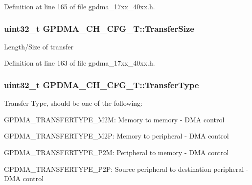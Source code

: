 Definition at line 165 of file gpdma\+\_\+17xx\+\_\+40xx.\+h.

\subsubsection[{\texorpdfstring{Transfer\+Size}{TransferSize}}]{\setlength{\rightskip}{0pt plus 5cm}uint32\+\_\+t G\+P\+D\+M\+A\+\_\+\+C\+H\+\_\+\+C\+F\+G\+\_\+\+T\+::\+Transfer\+Size}\hypertarget{structGPDMA__CH__CFG__T_a5666efb9edb055974b590443ea45ed7b}{}\label{structGPDMA__CH__CFG__T_a5666efb9edb055974b590443ea45ed7b}
Length/\+Size of transfer 

Definition at line 163 of file gpdma\+\_\+17xx\+\_\+40xx.\+h.

\subsubsection[{\texorpdfstring{Transfer\+Type}{TransferType}}]{\setlength{\rightskip}{0pt plus 5cm}uint32\+\_\+t G\+P\+D\+M\+A\+\_\+\+C\+H\+\_\+\+C\+F\+G\+\_\+\+T\+::\+Transfer\+Type}\hypertarget{structGPDMA__CH__CFG__T_a6c21f3fe48e5e23443a324f9a42a3886}{}\label{structGPDMA__CH__CFG__T_a6c21f3fe48e5e23443a324f9a42a3886}
Transfer Type, should be one of the following\+:
\begin{DoxyItemize}
\item G\+P\+D\+M\+A\+\_\+\+T\+R\+A\+N\+S\+F\+E\+R\+T\+Y\+P\+E\+\_\+\+M2M\+: Memory to memory -\/ D\+MA control
\item G\+P\+D\+M\+A\+\_\+\+T\+R\+A\+N\+S\+F\+E\+R\+T\+Y\+P\+E\+\_\+\+M2P\+: Memory to peripheral -\/ D\+MA control
\item G\+P\+D\+M\+A\+\_\+\+T\+R\+A\+N\+S\+F\+E\+R\+T\+Y\+P\+E\+\_\+\+P2M\+: Peripheral to memory -\/ D\+MA control
\item G\+P\+D\+M\+A\+\_\+\+T\+R\+A\+N\+S\+F\+E\+R\+T\+Y\+P\+E\+\_\+\+P2P\+: Source peripheral to destination peripheral -\/ D\+MA control 
\end{DoxyItemize}


